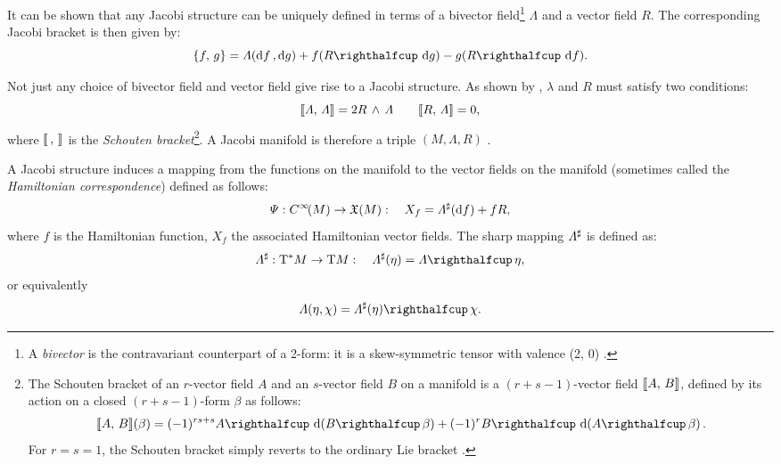 It can be shown that any Jacobi structure can be uniquely defined in terms of a bivector field\footnote{A \emph{bivector} is the contravariant counterpart of a 2-form: it is a skew-symmetric tensor with valence (2, 0) \cite{einstein1944}.} \(\Lambda\) and a vector field \(R\). The corresponding Jacobi bracket is then given by: \cite{Libermann1987,marle1991}
\begin{equation}
     \jacobi{f}{g} = \Lambda(\dd{f}, \dd{g}) + f (\intpr{R}{\dd{g}}) - g (\intpr{R}{\dd{f}}).
\end{equation}

Not just any choice of bivector field and vector field give rise to a Jacobi structure. As shown by \citet{lichnerowicz1977}, \(\lambda\) and \(R\) must satisfy two conditions:
\begin{equation}
     \llbracket\Lambda,\,\Lambda\rrbracket = 2  R\,\wedge\,\Lambda  \qquad \llbracket R,\,\Lambda\rrbracket = 0,
\end{equation}
where \(\llbracket\,,\,\rrbracket\) is the \emph{Schouten bracket}\footnote
{
    The Schouten bracket of an \(r\)-vector field \(A\) and an \(s\)-vector field \(B\) on a manifold is a \((r + s - 1)\)-vector field \(\llbracket A,\,B\rrbracket\), defined by its action on a closed \((r + s -1)\)-form \(\beta\) as follows:
    \begin{equation}
     \schouten{A}{B}(\beta) = (-1)^{rs + s}\intpr{A}{\dd{(\intpr{B}{\beta})}} + (-1)^r \intpr{B}{\dd{(\intpr{A}{\beta})}}.
\end{equation}
    For \(r = s = 1\), the Schouten bracket simply reverts to the ordinary Lie bracket \cite{dazord1991}.

}. A Jacobi manifold is therefore a triple \((M, \Lambda, R)\) \cite{Libermann1987}.

A Jacobi structure induces a mapping from the functions on the manifold to the vector fields on the manifold (sometimes called the \emph{Hamiltonian correspondence}) \cite{ciaglia2018,mahmood2012} defined as follows:
\begin{equation} 
    \Psi: C^\infty\!\qty(M) \to \mathfrak{X}\qty(M): \quad X_f = \Lambda^\sharp(\dd{f}) + f R,
    \label{eq:jacobi_ham_correspondence}
\end{equation}
where \(f\) is the Hamiltonian function, \(X_f\) the associated Hamiltonian vector fields. The sharp mapping \(\Lambda^\sharp\) is defined as:
\begin{equation}
     \fromDual{\Lambda}: \ctbundle{M} \to \tbundle{M}: \quad \fromDual{\Lambda}(\eta) = \intpr{\Lambda}{\eta},
\end{equation}
or equivalently
\begin{equation}
     \Lambda(\eta, \chi)  = \intpr{\fromDual{\Lambda}(\eta)}{\chi}.
\end{equation}

